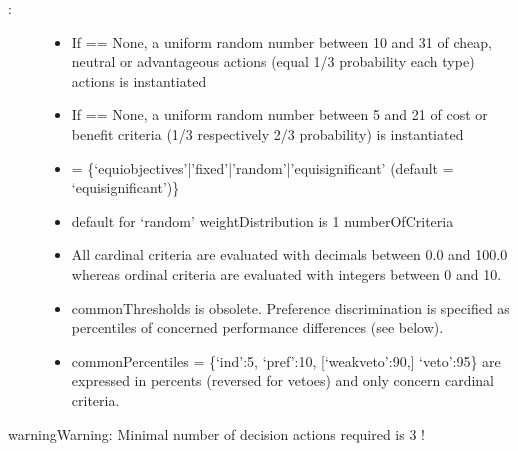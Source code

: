 \documentclass[a4paper,12pt,english]{sphinxhowto}
\begin{document}
\begin{description}
\item[{:}] \leavevmode\begin{itemize}
\item {} 
If  == None, a uniform random number between 10 and 31 of cheap, neutral or advantageous actions (equal 1/3 probability each type) actions is instantiated

\item {} 
If  == None, a uniform random number between 5 and 21 of cost or benefit criteria (1/3 respectively 2/3 probability) is instantiated

\item {} 
 = \{‘equiobjectives’|’fixed’|’random’|’equisignificant’ (default = ‘equisignificant’)\}

\item {} 
default  for ‘random’ weightDistribution is 1 \sphinxhyphen{} numberOfCriteria

\item {} 
All cardinal criteria are evaluated with decimals between 0.0 and 100.0 whereas ordinal criteria are evaluated with integers between 0 and 10.

\item {} 
commonThresholds is obsolete. Preference discrimination is specified as percentiles of concerned performance differences (see below).

\item {} 
commonPercentiles = \{‘ind’:5, ‘pref’:10, {[}‘weakveto’:90,{]} ‘veto’:95\} are expressed in percents (reversed for vetoes) and only concern cardinal criteria.

\end{itemize}

\end{description}

\begin{sphinxadmonition}{warning}{Warning:}
Minimal number of decision actions required is 3 !
\end{sphinxadmonition}
\end{document}
